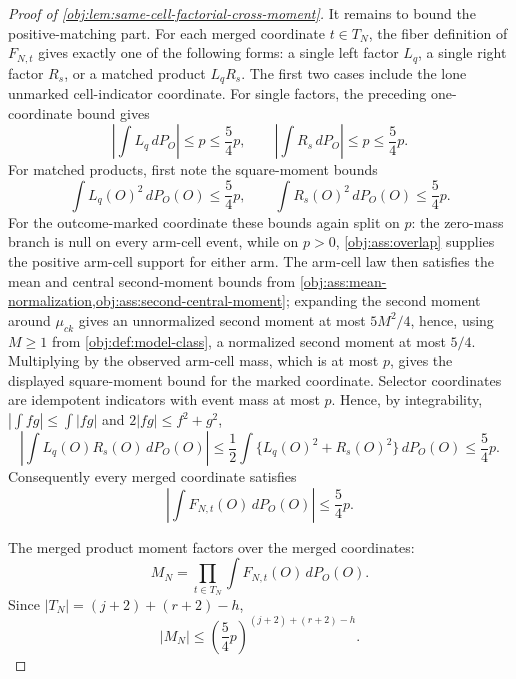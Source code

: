 \documentclass[11pt]{article}
\begin{document}
\begin{proof}[Proof of \cref{obj:lem:same-cell-factorial-cross-moment}]
It remains to bound the positive-matching part.  For each merged coordinate \(t\in T_N\), the fiber definition of \(F_{N,t}\) gives exactly one of the following forms: a single left factor \(L_q\), a single right factor \(R_s\), or a matched product \(L_qR_s\). The first two cases include the lone unmarked cell-indicator coordinate. For single factors, the preceding one-coordinate bound gives
\[
\left|\int L_q\,dP_O\right|\le p\le \frac54p,
\qquad
\left|\int R_s\,dP_O\right|\le p\le \frac54p.
\]
For matched products, first note the square-moment bounds
\[
\int L_q(O)^2\,dP_O(O)\le \frac54p,
\qquad
\int R_s(O)^2\,dP_O(O)\le \frac54p.
\]
For the outcome-marked coordinate these bounds again split on \(p\): the zero-mass branch is null on every arm-cell event, while on \(p>0\), \cref{obj:ass:overlap} supplies the positive arm-cell support for either arm. The arm-cell law then satisfies the mean and central second-moment bounds from \cref{obj:ass:mean-normalization,obj:ass:second-central-moment}; expanding the second moment around \(\mu_{ck}\) gives an unnormalized second moment at most \(5M^2/4\), hence, using \(M\ge1\) from \cref{obj:def:model-class}, a normalized second moment at most \(5/4\). Multiplying by the observed arm-cell mass, which is at most \(p\), gives the displayed square-moment bound for the marked coordinate. Selector coordinates are idempotent indicators with event mass at most \(p\). Hence, by integrability, \(|\int fg|\le\int|fg|\) and \(2|fg|\le f^2+g^2\),
\[
\left|\int L_q(O)R_s(O)\,dP_O(O)\right|
\le
\frac12\int\{L_q(O)^2+R_s(O)^2\}\,dP_O(O)
\le
\frac54p.
\]
Consequently every merged coordinate satisfies
\[
\left|
\int F_{N,t}(O)\,dP_O(O)
\right|
\le
\frac54p.
\]

The merged product moment factors over the merged coordinates:
\[
M_N=\prod_{t\in T_N}\int F_{N,t}(O)\,dP_O(O).
\]
Since \(|T_N|=(j+2)+(r+2)-h\),
\[
|M_N|
\le
\left(\frac54p\right)^{(j+2)+(r+2)-h}.
\]


\end{proof}
\end{document}
